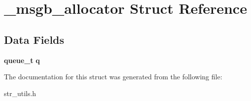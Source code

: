 \section{\+\_\+msgb\+\_\+allocator Struct Reference}
\label{struct__msgb__allocator}
\subsection*{Data Fields}
\begin{DoxyCompactItemize}
\item 
\mbox{\label{struct__msgb__allocator_a4a23257c1c0e0c35b6d0cf034414880c}} 
\textbf{ queue\+\_\+t} {\bfseries q}
\end{DoxyCompactItemize}


The documentation for this struct was generated from the following file\+:\begin{DoxyCompactItemize}
\item 
str\+\_\+utils.\+h\end{DoxyCompactItemize}
